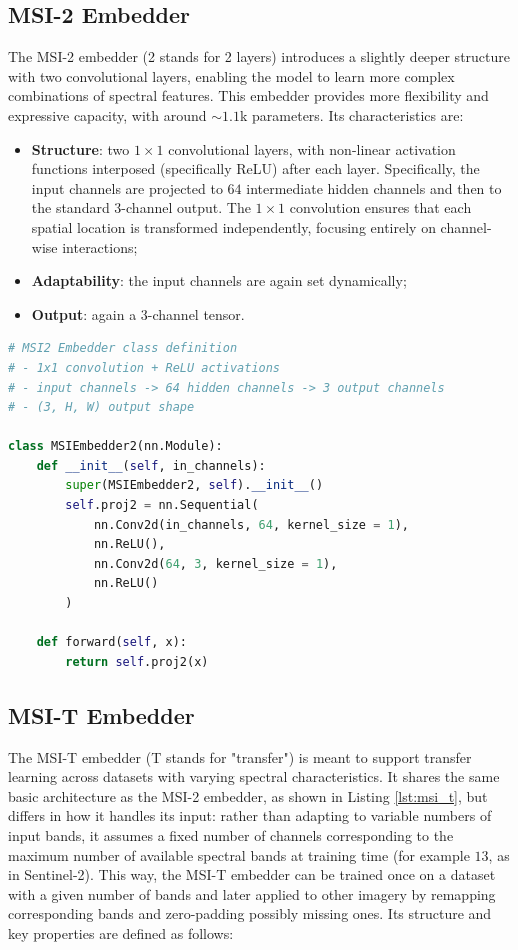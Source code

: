 \documentclass[a4paper, twoside, english]{sapthesis} %
\begin{document}
\subsection{MSI-2 Embedder}

The MSI-2 embedder (2 stands for 2 layers) introduces a slightly deeper structure with two convolutional layers, enabling the model to learn more complex combinations of spectral features. This embedder provides more flexibility and expressive capacity, with around $\sim 1.1$k parameters. Its characteristics are:

\begin{itemize}
    \item \textbf{Structure}: two $1\times1$ convolutional layers, with non-linear activation functions interposed (specifically ReLU) after each layer. Specifically, the input channels are projected to $64$ intermediate hidden channels and then to the standard 3-channel output. The $1\times1$ convolution ensures that each spatial location is transformed independently, focusing entirely on channel-wise interactions;
    \item \textbf{Adaptability}: the input channels are again set dynamically;
    \item \textbf{Output}: again a 3-channel tensor.
\end{itemize}


\begin{lstlisting}[language=Python, caption={MSI-2 Embedder implemented in PyTorch.}, label={lst:msi2}]
# MSI2 Embedder class definition
# - 1x1 convolution + ReLU activations
# - input channels -> 64 hidden channels -> 3 output channels
# - (3, H, W) output shape

class MSIEmbedder2(nn.Module):
    def __init__(self, in_channels):
        super(MSIEmbedder2, self).__init__()
        self.proj2 = nn.Sequential(
            nn.Conv2d(in_channels, 64, kernel_size = 1),
            nn.ReLU(),
            nn.Conv2d(64, 3, kernel_size = 1),
            nn.ReLU()
        )

    def forward(self, x):
        return self.proj2(x)
\end{lstlisting}


\subsection{MSI-T Embedder}

The MSI-T embedder (T stands for "transfer") is meant to support transfer learning across datasets with varying spectral characteristics. It shares the same basic architecture as the MSI-2 embedder, as shown in Listing \ref{lst:msi_t}, but differs in how it handles its input: rather than adapting to variable numbers of input bands, it assumes a fixed number of channels corresponding to the maximum number of available spectral bands at training time (for example $13$, as in Sentinel-2). This way, the MSI-T embedder can be trained once on a dataset with a given number of bands and later applied to other imagery by remapping corresponding bands and zero-padding possibly missing ones. Its structure and key properties are defined as follows:
\end{document}
